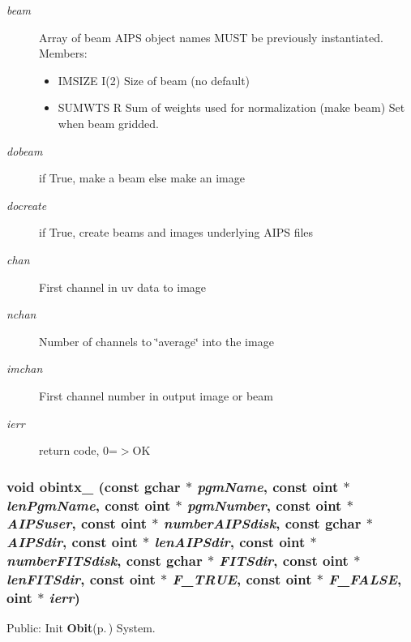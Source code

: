 \begin{Desc}
\begin{description}
\item[{\em beam}]Array of beam AIPS object names MUST be previously instantiated. Members: \begin{itemize}
\item IMSIZE I(2) Size of beam (no default) \item SUMWTS R Sum of weights used for normalization (make beam) Set when beam gridded. \end{itemize}
\item[{\em dobeam}]if True, make a beam else make an image \item[{\em docreate}]if True, create beams and images underlying AIPS files \item[{\em chan}]First channel in uv data to image \item[{\em nchan}]Number of channels to \char`\"{}average\char`\"{} into the image \item[{\em imchan}]First channel number in output image or beam \item[{\em ierr}]return code, 0=$>$OK \end{description}
\end{Desc}
\subsubsection{\setlength{\rightskip}{0pt plus 5cm}void obintx\_\- (const gchar $\ast$ {\em pgm\-Name}, const {\bf oint} $\ast$ {\em len\-Pgm\-Name}, const {\bf oint} $\ast$ {\em pgm\-Number}, const {\bf oint} $\ast$ {\em AIPSuser}, const {\bf oint} $\ast$ {\em number\-AIPSdisk}, const gchar $\ast$ {\em AIPSdir}, const {\bf oint} $\ast$ {\em len\-AIPSdir}, const {\bf oint} $\ast$ {\em number\-FITSdisk}, const gchar $\ast$ {\em FITSdir}, const {\bf oint} $\ast$ {\em len\-FITSdir}, const {\bf oint} $\ast$ {\em F\_\-TRUE}, const {\bf oint} $\ast$ {\em F\_\-FALSE}, {\bf oint} $\ast$ {\em ierr})}\label{ObitAIPSFortran_8c_a4}


Public: Init {\bf Obit}{\rm (p.\,\pageref{structObit})} System. 

